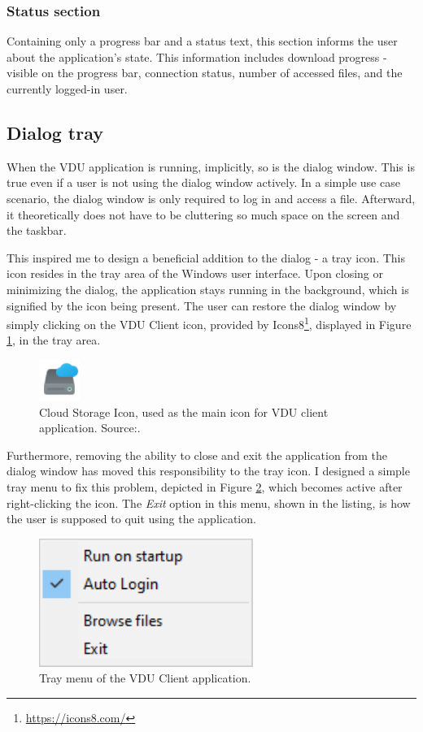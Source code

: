 \subsubsection{Status section}
\label{statussectionui}
Containing only a progress bar and a status text, this section informs the user about the application's state. This information includes download progress - visible on the progress bar, connection status, number of accessed files, and the currently logged-in user.

\subsection{Dialog tray}
When the VDU application is running, implicitly, so is the dialog window. This is true even if a user is not using the dialog window actively. In a simple use case scenario, the dialog window is only required to log in and access a file. Afterward, it theoretically does not have to be cluttering so much space on the screen and the taskbar. 

This inspired me to design a beneficial addition to the dialog - a tray icon. This icon resides in the tray area of the Windows user interface. Upon closing or minimizing the dialog, the application stays running in the background, which is signified by the icon being present. The user can restore the dialog window by simply clicking on the VDU Client icon, provided by Icons8\footnote{\url{https://icons8.com/}}, displayed in Figure \ref{iconscloud}, in the tray area.

\begin{figure}[H]
    \centering
	\includegraphics[width=50px]{obrazky-figures/cloudicon.pdf}
	\caption{Cloud Storage Icon, used as the main icon for VDU client application. Source:\cite{Icons8Cloud}.}
	\label{iconscloud}
\end{figure}

Furthermore, removing the ability to close and exit the application from the dialog window has moved this responsibility to the tray icon. I designed a simple tray menu to fix this problem, depicted in Figure \ref{traymenuex}, which becomes active after right-clicking the icon. The \textit{Exit} option in this menu, shown in the listing, is how the user is supposed to quit using the application.

\begin{figure}[H]
    \centering
	\includegraphics[]{obrazky-figures/traymenu.pdf}
	\caption{Tray menu of the VDU Client application.}
	\label{traymenuex}
\end{figure}

